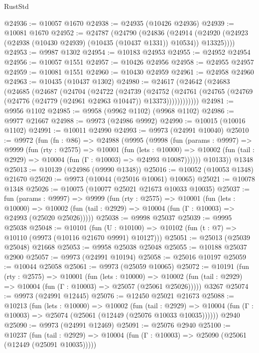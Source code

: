 \begin{lexlean}{RustStd}
\begin{coremodule}
@24936 := @10057 @1670
@24938 := @24935 (@10426 @24936)
@24939 := @10081 @1670
@24952 := @24787
    (@24790
      (@24836
        (@24914 (@24920 (@24923 (@24938 (@10430 @24939) (@10435 (@10437 @1331)) @10534)) @13325))))
@24953 := @9987 @1302
@24954 := @10183 @24953
@24955 := @24952 @24954
@24956 := @10057 @1551
@24957 := @10426 @24956
@24958 := @24955 @24957
@24959 := @10081 @1551
@24960 := @10430 @24959
@24961 := @24958 @24960
@24963 := @10435 (@10437 @1302)
@24980 := @24617
    (@24642
      (@24683
        (@24685
          (@24687
            (@24704
              (@24722
                (@24739
                  (@24752
                    (@24761
                      (@24765 (@24769 (@24776 (@24779 (@24961 @24963 @10447)) @13373))))))))))))
@24981 := @9956 @1102
@24985 := @9958 (@9962 @1102) (@9968 @1102)
@24986 := @9977 @21667
@24988 := @9973 (@24986 @9992)
@24990 := @10015 (@10016 @1102)
@24991 := @10011 @24990
@24993 := @9973 (@24991 @10040)
@25010 := @9972
    (fun (fn : @86) =>
    @24988
      (@9995
        (@9998
          (fun (params : @9997) =>
          @9999
            (fun (rty : @2575) =>
            @10001
              (fun (lets : @10000) =>
              @10002 (fun (tail : @2929) => @10004 (fun (Γ : @10003) => @24993 @10087))))))
        @10133))
    @1348
@25013 := @10139 (@24986 (@9990 @1348))
@25016 := @10052 (@10053 @1348) @21670
@25020 := @9973 (@10044 (@25016 @10061) @10065)
@25021 := @10078 @1348
@25026 := @10075 (@10077 @25021 @21673 @10033 @10035)
@25037 := fun (params : @9997) =>
  @9999
    (fun (rty : @2575) =>
    @10001
      (fun (lets : @10000) =>
      @10002 (fun (tail : @2929) => @10004 (fun (Γ : @10003) => @24993 (@25020 @25026)))))
@25038 := @9998 @25037
@25039 := @9995 @25038
@25048 := @10101
    (fun (U : @10100) => @10102 (fun (t : @7) => @10110 (@9973 (@10116 @21670 @9991) @10127)))
@25051 := @25013 (@25039 @25048) @21668
@25053 := @9958 @25038 @25048
@25055 := @10188 @25037 @2900
@25057 := @9973 (@24991 @10194)
@25058 := @25016 @10197
@25059 := @10044 @25058
@25061 := @9973 (@25059 @10065)
@25072 := @10191
    (fun (rty : @2575) =>
    @10001
      (fun (lets : @10000) =>
      @10002 (fun (tail : @2929) => @10004 (fun (Γ : @10003) => @25057 (@25061 @25026)))))
    @3267
@25074 := @9973 (@24991 @12445)
@25076 := @12450 @25021 @21673
@25088 := @10213
    (fun (lets : @10000) =>
    @10002
      (fun (tail : @2929) =>
      @10004 (fun (Γ : @10003) => @25074 (@25061 (@12449 (@25076 @10033 @10035))))))
    @2940
@25090 := @9973 (@24991 @12469)
@25091 := @25076 @2940
@25100 := @10237
    (fun (tail : @2929) => @10004 (fun (Γ : @10003) => @25090 (@25061 (@12449 (@25091 @10035)))))

\end{coremodule}
\end{lexlean}
